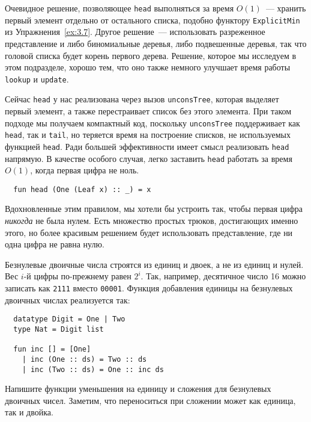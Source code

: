 \begin{remark}
  Очевидное решение, позволяющее \lstinline!head! выполняться за время
  $O(1)$~--- хранить первый элемент отдельно от остального списка,
  подобно функтору \lstinline!ExplicitMin! из
  Упражнения~\ref{ex:3.7}. Другое решение~--- использовать разреженное
  представление и либо биномиальные деревья, либо подвешенные деревья, так что
  головой списка будет корень первого дерева. Решение, которое мы
  исследуем в этом подразделе, хорошо тем, что оно также немного
  улучшает время работы \lstinline!lookup! и \lstinline!update!.
\end{remark}

Сейчас \lstinline!head! у нас реализована через вызов
\lstinline!unconsTree!, которая выделяет первый элемент, а также
перестраивает список без этого элемента. При таком подходе мы получаем
компактный код, поскольку \lstinline!unconsTree! поддерживает как
\lstinline!head!, так и \lstinline!tail!, но теряется время
на построение списков, не используемых функцией
\lstinline!head!. Ради большей эффективности имеет смысл реализовать
\lstinline!head! напрямую. В качестве особого случая, легко заставить
\lstinline!head! работать за время $O(1)$, когда первая цифра не ноль.
\begin{lstlisting}
  fun head (One (Leaf x) :: _) = x
\end{lstlisting}
Вдохновленные этим правилом, мы хотели бы устроить так, чтобы первая
цифра \emph{никогда} не была нулем. Есть множество простых трюков,
достигающих именно этого, но более красивым решением будет
использовать  представление, где ни одна
цифра не равна нулю.

Безнулевые двоичные числа строятся из единиц и двоек, а не из единиц и
нулей. Вес $i$-й цифры по-прежнему равен $2^i$. Так, например,
десятичное число 16 можно записать как \texttt{2111} вместо
\texttt{00001}. Функция добавления единицы на безнулевых двоичных
числах реализуется так:
\begin{lstlisting}
  datatype Digit = One | Two
  type Nat = Digit list

  fun inc [] = [One]
    | inc (One :: ds) = Two :: ds
    | inc (Two :: ds) = One :: inc ds
\end{lstlisting}

\begin{exercise}\label{ex:9.4}
  Напишите функции уменьшения на единицу и сложения для безнулевых
  двоичных чисел. Заметим, что переноситься при сложении может как
  единица, так и двойка.
\end{exercise}

